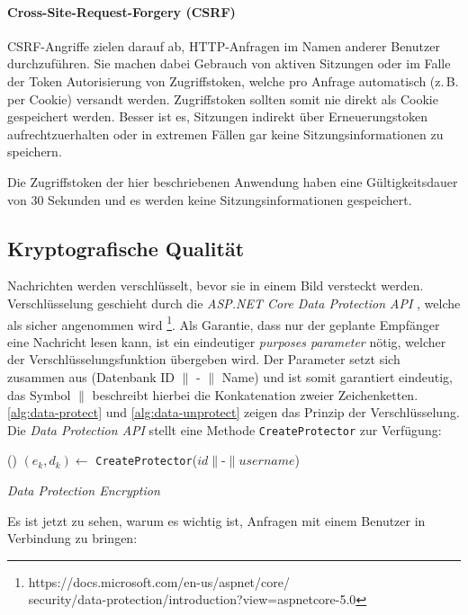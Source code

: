 \paragraph{Cross-Site-Request-Forgery (CSRF)}
CSRF-Angriffe zielen darauf ab, HTTP-An\-fragen im
Namen anderer Benutzer durchzuführen. Sie machen dabei Gebrauch von
aktiven Sitzungen oder im Falle der Token Autorisierung von Zugriffstoken,
welche pro Anfrage automatisch (z.\,B. per Cookie) versandt werden.
Zugriffstoken sollten somit nie direkt als Cookie gespeichert werden. Besser
ist es, Sitzungen indirekt über Erneuerungstoken aufrechtzuerhalten oder
in extremen Fällen gar keine Sitzungsinformationen zu speichern.

\noindent
Die Zugriffstoken der hier beschriebenen Anwendung haben eine Gültigkeitsdauer
von 30 Sekunden und es werden keine Sitzungsinformationen gespeichert.

\subsection{Kryptografische Qualität}
Nachrichten werden verschlüsselt, bevor sie in einem Bild versteckt werden.
Verschlüssel\-ung geschieht durch die \textit{ASP.NET Core Data Protection API}
, welche als sicher angenommen wird \footnote{https://docs.microsoft.com/en-us/aspnet/core/\\
  security/data-protection/introduction?view=aspnetcore-5.0}.
Als Garantie, dass nur der geplante Empfänger eine Nachricht lesen
kann, ist ein eindeutiger \textit{purposes parameter} nötig, welcher
der Verschlüsselungsfunktion übergeben wird.
Der Parameter setzt sich zusammen aus (Datenbank ID $\parallel$ - $\parallel$ Name)
und ist somit garantiert eindeutig, das Symbol $\parallel$
beschreibt hierbei die Konkatenation zweier Zeichenketten.
\autoref{alg:data-protect} und \ref{alg:data-unprotect}
zeigen das Prinzip der Verschlüsselung. Die \textit{Data Protection API} stellt
eine Methode \texttt{CreateProtector} zur Verfügung:
\begin{algorithm}[h]
  \DontPrintSemicolon
  \Begin(){
    $(e_k, d_k) \leftarrow$ \texttt{CreateProtector}($id \parallel \text{-} \parallel username$)\;
  }
  \caption{\textit{Data Protection Encryption}}
  \label{alg:data-protect}
\end{algorithm}

\noindent
Es ist jetzt zu sehen, warum es wichtig ist, Anfragen mit einem Benutzer in Verbindung zu bringen:

